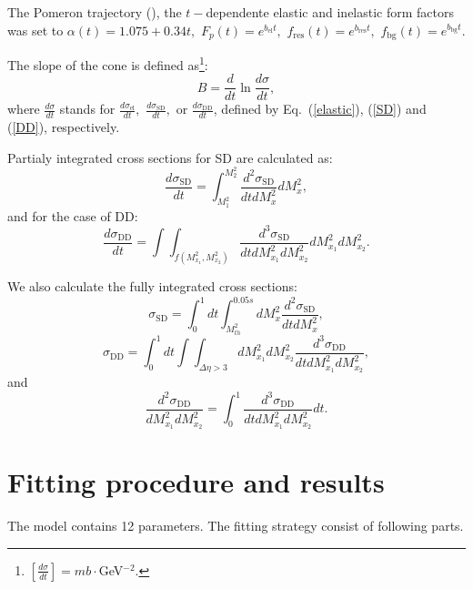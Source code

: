 \documentclass[12pt]{article}
\begin{document}
 The Pomeron trajectory (\cite{JLL}), the  $t-$dependente elastic and inelastic form factors  was set to $\alpha(t)=1.075+0.34t,$ $F_p(t)=e^{b_\mathrm{el}t},$ $f_\mathrm{res}(t)=e^{b_\mathrm{res}t},$ $f_\mathrm{bg}(t)=e^{b_\mathrm{bg}t}.$

 The slope of the cone is defined as\footnote{$\left[\frac{d\sigma}{dt}\right]=mb\cdot$GeV$^{-2}$.}:
  \begin{equation}\label{eq:B}
    B=\frac{d}{dt}\ln\frac{d\sigma}{dt},
  \end{equation}
where $\frac{d\sigma}{dt}$ stands for $\frac{d\sigma_\mathrm{el}}{dt},$  $\frac{d\sigma_\mathrm{SD}}{dt},$ or $\frac{d\sigma_\mathrm{DD}}{dt}$,  defined by Eq.~(\ref{elastic}), (\ref{SD}) and  (\ref{DD}), respectively.

  

  Partialy integrated cross sections for SD are calculated as:
  \begin{equation}\label{eq:dcsdt_SD}
    \frac{d\sigma_\mathrm{SD}}{dt}=\int_{M^2_1}^{M^2_2}\frac{d^2\sigma_\mathrm{SD}}{dtdM_x^2}dM_x^2,
  \end{equation}
  and for the case of DD:
  \begin{equation}\label{eq:dcsdt_DD}
    \frac{d\sigma_\mathrm{DD}}{dt}= \int\int_{f(M^2_{x_1},M^2_{x_2})}\frac{d^3\sigma_\mathrm{SD}}{ dtdM_{x_1}^2 dM_{x_2}^2 }dM_{x_1}^2dM_{x_2}^2.
  \end{equation}

  We also calculate the fully integrated cross sections:
  \begin{equation}
  \sigma_\mathrm{SD}=\int_{0}^{1}dt\int_{M^2_{th}}^{0.05s}dM_{x}^2 \frac{d^2\sigma_\mathrm{SD}}{dtdM_{x}^2},
  \end{equation}
  \begin{equation}
   \sigma_\mathrm{DD}=\int_{0}^{1}dt\int\int_{\Delta\eta>3}dM_{x_1}^2dM_{x_2}^2 \frac{d^3\sigma_\mathrm{DD}}{dtdM_{x_1}^2dM_{x_2}^2},
  \end{equation}
  and
  \begin{equation}
  \frac{d^2\sigma_\mathrm{DD}}{dM_{x_1}^2dM_{x_2}^2}= \int_{0}^{1}\frac{d^3\sigma_\mathrm{DD}}{dtdM_{x_1}^2dM_{x_2}^2}dt.
  \end{equation}

\section{Fitting procedure and results}\label{sec:Results}
The model contains 12 parameters. The fitting strategy consist of following parts.
\end{document}
